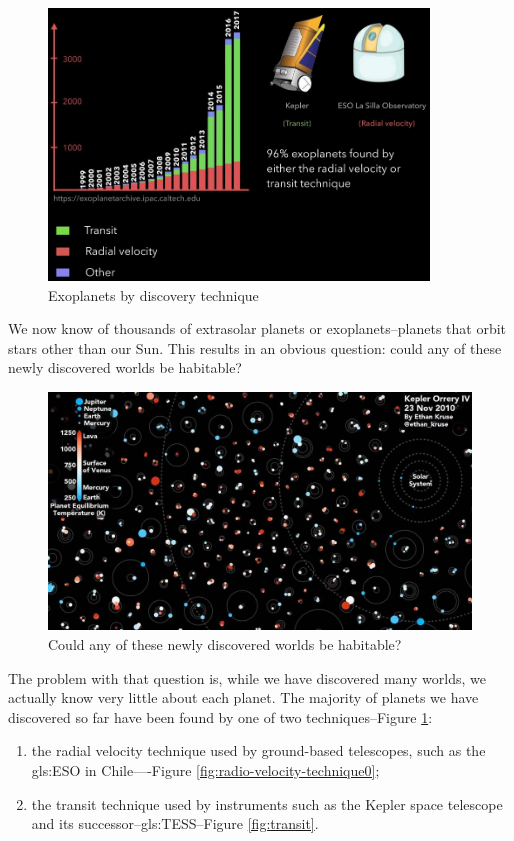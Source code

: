 \documentclass[]{article}
\begin{document}
\begin{figure}[H]
	\caption{Exoplanets by discovery technique}\label{fig:exoplants}
	\includegraphics[width=0.9\textwidth]{Exoplanets}
\end{figure}

We now know of thousands of extrasolar planets or exoplanets--planets that orbit stars
other than our Sun.
This results in an obvious question: could any of these newly discovered worlds be habitable?

\begin{figure}[H]
	\caption{Could any of these newly discovered
		worlds be habitable?}\label{fig:could-any-be-habitable}
	\includegraphics[width=\textwidth]{could-any-be-habitable}
\end{figure}
The problem with that question is, while we have discovered many worlds, we actually know very little about each planet. The majority of planets
we have discovered so far have been found by one of two techniques--Figure \ref{fig:exoplants}:
\begin{enumerate}
	\item the radial velocity technique used by ground-based telescopes, such as the \gls{gls:ESO}  in Chile----Figure \ref{fig:radio-velocity-technique0};
	\item the transit technique used by instruments such as the Kepler space telescope and its successor--\gls{gls:TESS}--Figure \ref{fig:transit}.
\end{enumerate}
\end{document}
